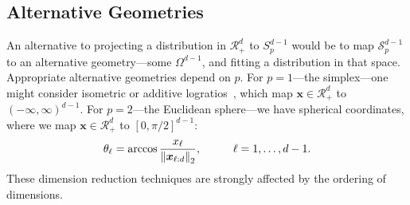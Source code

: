 \subsection{Alternative Geometries}
An alternative to projecting a distribution in $\mathcal{R}_+^d$ to $S_{p}^{d-1}$ would be to map
  $\mathcal{S}_{p}^{d-1}$ to an alternative geometry---some $\Omega^{d-1}$, and fitting a
  distribution in that space. Appropriate alternative geometries depend on $p$.  For
  $p = 1$---the simplex---one might consider isometric or additive logratios~\citep{aitchison1982},
  which map $\bm{x}\in\mathcal{R}_+^{d}$ to $(-\infty, \infty)^{d-1}$.  For $p = 2$---the Euclidean
  sphere---we have spherical coordinates, where we map $\bm{x}\in\mathcal{R}_+^d$ to $[0,\pi/2]^{d-1}$:
  \begin{equation*}
      \theta_{\ell} = \arccos\frac{x_{\ell}}{\pnorm{\bm{x}_{{\ell}:d}}{2}},\hspace{1cm}{\ell} = 1,\ldots,d-1.
  \end{equation*}
  These dimension reduction techniques are strongly affected by the ordering of dimensions.

